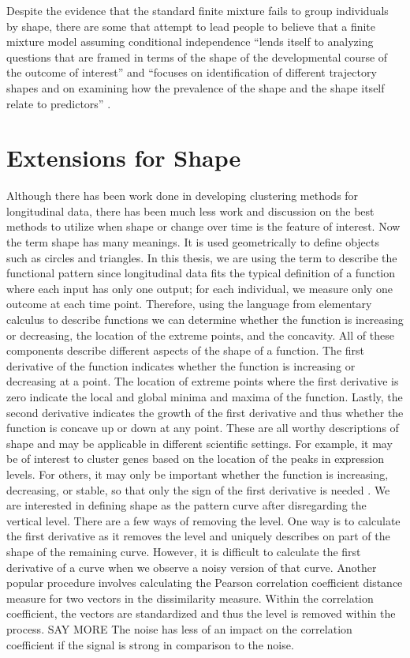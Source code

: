 \documentclass[12pt]{article}
\begin{document}
Despite the evidence that the standard finite mixture fails to group individuals by shape, there are some that attempt to lead people to believe that a finite mixture model assuming conditional independence ``lends itself to analyzing questions that are framed in terms of the shape of the developmental course of the outcome of interest''  and  ``focuses on identification of different trajectory shapes and on examining how the prevalence of the shape and the shape itself relate to predictors'' \cite{nagin}.

\section{Extensions for Shape}
Although there has been work done in developing clustering methods for longitudinal data, there has been much less work and discussion on the best methods to utilize when shape or change over time is the feature of interest. Now the term shape has many meanings. It is used geometrically to define objects such as circles and triangles. In this thesis, we are using the term to describe the functional pattern since longitudinal data fits the typical definition of a function where each input has only one output; for each individual, we measure only one outcome at each time point. Therefore, using the language from elementary calculus to describe functions we can determine whether the function is increasing or decreasing, the location of the extreme points, and the concavity. All of these components describe different aspects of the shape of a function. The first derivative of the function indicates whether the function is increasing or decreasing at a point. The location of extreme points where the first derivative is zero indicate the local and global minima and maxima of the function. Lastly, the second derivative indicates the growth of the first derivative and thus whether the function is concave up or down at any point. These are all worthy descriptions of shape and may be applicable in different scientific settings. For example, it may be of interest to cluster genes based on the location of the peaks in expression levels. For others, it may only be important whether the function is increasing, decreasing, or stable, so that only the sign of the first derivative is needed \cite{phang2003}. We are interested in defining shape as the pattern curve after disregarding the vertical level. There are a few ways of removing the level. One way is to calculate the first derivative as it removes the level and uniquely describes on part of the shape of the remaining curve. However, it is difficult to calculate the first derivative of a curve when we observe a noisy version of that curve. Another popular procedure involves calculating the Pearson correlation coefficient distance measure for two vectors in the dissimilarity measure. Within the correlation coefficient, the vectors are standardized and thus the level is removed within the process. SAY MORE The noise has less of an impact on the correlation coefficient if the signal is strong in comparison to the noise.
\end{document}
